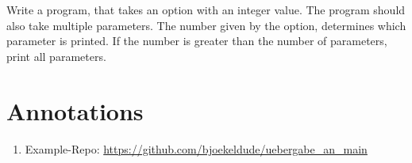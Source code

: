 \documentclass{dcbl/challenge}
\begin{document}
\begin{aufgabe}
    Write a program, that takes an option with an integer value.
    The program should also take multiple parameters. 
    The number given by the option, determines which parameter is printed.
    If the number is greater than the number of parameters, print all parameters.
\end{aufgabe}

\section*{Annotations}
\begin{enumerate}
    \item Example-Repo: \url{https://github.com/bjoekeldude/uebergabe_an_main}
\end{enumerate}
\end{document}
